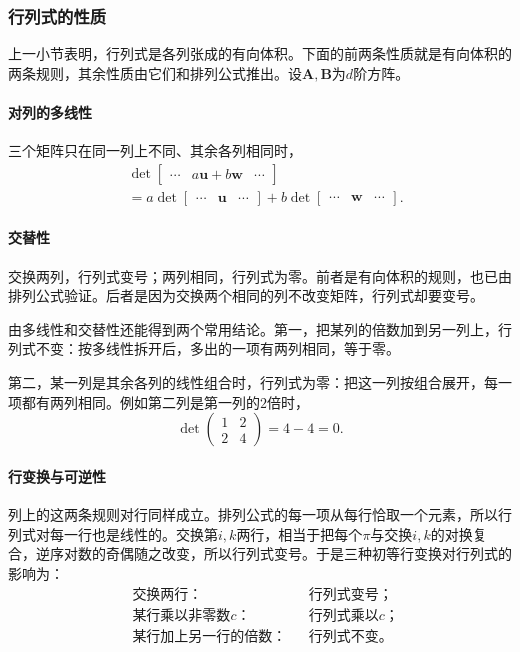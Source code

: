 \subsubsection{行列式的性质}

上一小节表明，行列式是各列张成的有向体积。下面的前两条性质就是有向体积的两条规则，其余性质由它们和排列公式推出。设$\bm A,\bm B$为$d$阶方阵。

\paragraph{对列的多线性}
三个矩阵只在同一列上不同、其余各列相同时，
\[
 \begin{aligned}
 &\det\begin{bmatrix}\cdots&a\bm u+b\bm w&\cdots\end{bmatrix}\\
 &=a\det\begin{bmatrix}\cdots&\bm u&\cdots\end{bmatrix}
 +b\det\begin{bmatrix}\cdots&\bm w&\cdots\end{bmatrix}.
 \end{aligned}
\]

\paragraph{交替性}
交换两列，行列式变号；两列相同，行列式为零。前者是有向体积的规则，也已由排列公式验证。后者是因为交换两个相同的列不改变矩阵，行列式却要变号。

由多线性和交替性还能得到两个常用结论。第一，把某列的倍数加到另一列上，行列式不变：按多线性拆开后，多出的一项有两列相同，等于零。

第二，某一列是其余各列的线性组合时，行列式为零：把这一列按组合展开，每一项都有两列相同。例如第二列是第一列的$2$倍时，
\[
 \det\begin{pmatrix}1&2\\2&4\end{pmatrix}=4-4=0.
\]

\paragraph{行变换与可逆性}
列上的这两条规则对行同样成立。排列公式的每一项从每行恰取一个元素，所以行列式对每一行也是线性的。交换第$i,k$两行，相当于把每个$\pi$与交换$i,k$的对换复合，逆序对数的奇偶随之改变，所以行列式变号。于是三种初等行变换对行列式的影响为：
\[
 \begin{aligned}
 &\text{交换两行：}&&\text{行列式变号；}\\
 &\text{某行乘以非零数}c\text{：}&&\text{行列式乘以}c\text{；}\\
 &\text{某行加上另一行的倍数：}&&\text{行列式不变。}
 \end{aligned}
\]

